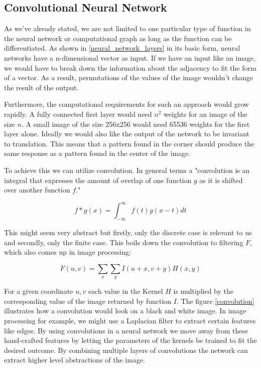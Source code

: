 \subsection{Convolutional Neural Network}
As we've already stated, we are not limited to one particular type of function in the neural network or computational graph as long as the function can be differentiated. As shown in \ref{neural_network_layers} in its basic form, neural networks have a n-dimensional vector as input. If we have an input like an image, we would have to break down the information about the adjacency to fit the form of a vector. As a result, permutations of the values of the image wouldn't change the result of the output.

Furthermore, the computational requirements for such an approach would grow rapidly. A fully connected first layer would need $n^2$ weights for an image of the size $n$. A small image of the size 256x256 would need 65536 weights for the first layer alone. Ideally we would also like the output of the network to be invariant to translation. This means that a pattern found in the corner should produce the same response as a pattern found in the center of the image.

To achieve this we can utilize convolution. In general terms a "convolution is an integral that expresses the amount of overlap of one function $g$ as it is shifted over another function $f$." \cite{weisstein_convolution_nodate}

$$
    f * g(x) = \int_{-\infty}^{\infty} f(t)g(x - t) dt
$$

This might seem very abstract but firstly, only the discrete case is relevant to us and secondly, only the finite case. This boils down the convolution to filtering $F$, which also comes up in image processing:

$$
    F(u, v) = \sum_{x} \sum_{y} I(u+x, v+y)H(x, y)
$$

For a given coordinate $u,v$ each value in the Kernel $H$ is multiplied by the  corresponding value of the image returned by function $I$. The figure \ref{convolution} illustrates how a convolution would look on a black and white image. In image processing for example, we might use a Laplacian filter to extract certain features like edges. By using convolutions in a neural network we move away from these hand-crafted features by letting the parameters of the kernels be trained to fit the desired outcome. By combining multiple layers of convolutions the network can extract higher level abstractions of the image. \cite{ilin_abstraction_2017}

